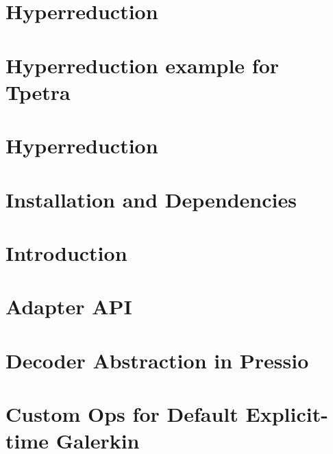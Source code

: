 \let\mypdfximage\pdfximage\def\pdfximage{\immediate\mypdfximage}\documentclass[twoside]{book}
\newcommand{\+}{\discretionary{\mbox{\scriptsize$\hookleftarrow$}}{}{}}
\begin{document}
\chapter{Hyperreduction}
\label{md_pages_hyperreduction_hyperred_how_to_enable}

\chapter{Hyperreduction example for Tpetra}
\label{md_pages_hyperreduction_hyperred_tpetra_example}

\chapter{Hyperreduction}
\label{md_pages_hyperreduction}

\chapter{Installation and Dependencies}
\label{md_pages_installation}

\chapter{Introduction}
\label{md_pages_introduction}

\chapter{Adapter API}
\label{md_pages_old_coreconcepts_adapter_api}

\chapter{Decoder Abstraction in Pressio}
\label{md_pages_old_coreconcepts_decoder}

\chapter{Custom Ops for Default Explicit-\/time Galerkin}
\label{md_pages_old_custom_ops_default_gal_exp}

\end{document}
